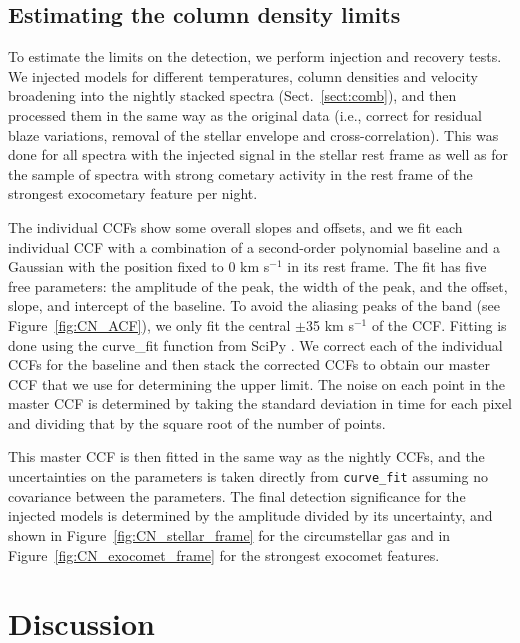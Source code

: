 \documentclass{aa}
\newcommand{\kms}{km s$^{-1}$}
\begin{document}
\subsection{Estimating the \texorpdfstring{}{CN} column density limits}\label{sect:CNlim}

To estimate the limits on the  detection, we perform injection and recovery tests.
%
We injected models for different temperatures, column densities and velocity broadening into the nightly stacked spectra (Sect.~\ref{sect:comb}), and then processed them in the same way as the original data (i.e., correct for residual blaze variations, removal of the stellar envelope and cross-correlation).
%
This was done for all spectra with the injected signal in the stellar rest frame as well as for the sample of spectra with strong cometary activity in the rest frame of the strongest exocometary feature per night.

The individual CCFs show some overall slopes and offsets, and we fit each individual CCF with a combination of a second-order polynomial baseline and a Gaussian with the position fixed to 0 \kms{} in its rest frame.
%
The fit has five free parameters: the amplitude of the peak, the width of the peak, and the offset, slope, and intercept of the baseline.
%
To avoid the aliasing peaks of the  band (see Figure~\ref{fig:CN_ACF}), we only fit the central $\pm$35 \kms{} of the CCF.
%
Fitting is done using the curve\_fit function from SciPy \citep{2020SciPy-NMeth}.
%
We correct each of the individual CCFs for the baseline and then stack the corrected CCFs to obtain our master CCF that we use for determining the upper limit.
%
The noise on each point in the master CCF is determined by taking the standard deviation in time for each pixel and dividing that by the square root of the number of points.

This master CCF is then fitted in the same way as the nightly CCFs, and the uncertainties on the parameters is taken directly from {\tt curve\_fit} assuming no covariance between the parameters.
%
The final detection significance for the injected models is determined by the amplitude divided by its uncertainty, and shown in Figure~\ref{fig:CN_stellar_frame} for the circumstellar gas and in Figure~\ref{fig:CN_exocomet_frame} for the strongest exocomet features.

\section{Discussion}\label{sec:discuss}
\end{document}
